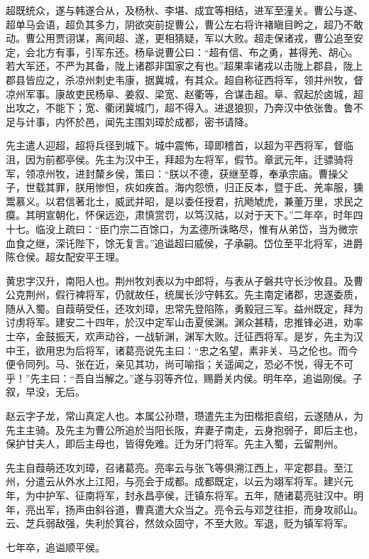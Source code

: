 \documentclass[12pt,UTF8]{ctexbook}
\begin{document}
超既统众，遂与韩遂合从，及杨秋、李堪、成宜等相结，进军至潼关。曹公与遂、超单马会语，超负其多力，阴欲突前捉曹公，曹公左右将许褚瞋目盻之，超乃不敢动。曹公用贾诩谋，离间超、遂，更相猜疑，军以大败。超走保诸戎，曹公追至安定，会北方有事，引军东还。杨阜说曹公曰：“超有信、布之勇，甚得羌、胡心。若大军还，不严为其备，陇上诸郡非国家之有也。”超果率诸戎以击陇上郡县，陇上郡县皆应之，杀凉州刺史韦康，据冀城，有其众。超自称征西将军，领并州牧，督凉州军事。康故吏民杨阜、姜叙、梁宽、赵衢等，合谋击超。阜、叙起於卤城，超出攻之，不能下；宽、衢闭冀城门，超不得入。进退狼狈，乃奔汉中依张鲁。鲁不足与计事，内怀於邑，闻先主围刘璋於成都，密书请降。

先主遣人迎超，超将兵径到城下。城中震怖，璋即稽首，以超为平西将军，督临沮，因为前都亭侯。先主为汉中王，拜超为左将军，假节。章武元年，迁骠骑将军，领凉州牧，进封斄乡侯，策曰：“朕以不德，获继至尊，奉承宗庙。曹操父子，世载其罪，朕用惨怛，疢如疾首。海内怨愤，归正反本，暨于氐、羌率服，獯鬻慕义。以君信著北土，威武并昭，是以委任授君，抗飏虓虎，兼董万里，求民之瘼。其明宣朝化，怀保远迩，肃慎赏罚，以笃汉祜，以对于天下。”二年卒，时年四十七。临没上疏曰：“臣门宗二百馀口，为孟德所诛略尽，惟有从弟岱，当为微宗血食之继，深讬陛下，馀无复言。”追谥超曰威侯，子承嗣。岱位至平北将军，进爵陈仓侯。超女配安平王理。

黄忠字汉升，南阳人也。荆州牧刘表以为中郎将，与表从子磐共守长沙攸县。及曹公克荆州，假行裨将军，仍就故任，统属长沙守韩玄。先主南定诸郡，忠遂委质，随从入蜀。自葭萌受任，还攻刘璋，忠常先登陷陈，勇毅冠三军。益州既定，拜为讨虏将军。建安二十四年，於汉中定军山击夏侯渊。渊众甚精，忠推锋必进，劝率士卒，金鼓振天，欢声动谷，一战斩渊，渊军大败。迁征西将军。是岁，先主为汉中王，欲用忠为后将军，诸葛亮说先主曰：“忠之名望，素非关、马之伦也。而今便令同列。马、张在近，亲见其功，尚可喻指；关遥闻之，恐必不悦，得无不可乎！”先主曰：“吾自当解之。”遂与羽等齐位，赐爵关内侯。明年卒，追谥刚侯。子叙，早没，无后。

赵云字子龙，常山真定人也。本属公孙瓒，瓒遣先主为田楷拒袁绍，云遂随从，为先主主骑。及先主为曹公所追於当阳长阪，弃妻子南走，云身抱弱子，即后主也，保护甘夫人，即后主母也，皆得免难。迁为牙门将军。先主入蜀，云留荆州。

先主自葭萌还攻刘璋，召诸葛亮。亮率云与张飞等俱溯江西上，平定郡县。至江州，分遣云从外水上江阳，与亮会于成都。成都既定，以云为翊军将军。建兴元年，为中护军、征南将军，封永昌亭侯，迁镇东将军。五年，随诸葛亮驻汉中。明年，亮出军，扬声由斜谷道，曹真遣大众当之。亮令云与邓芝往拒，而身攻祁山。云、芝兵弱敌强，失利於箕谷，然敛众固守，不至大败。军退，贬为镇军将军。

七年卒，追谥顺平侯。
\end{document}
